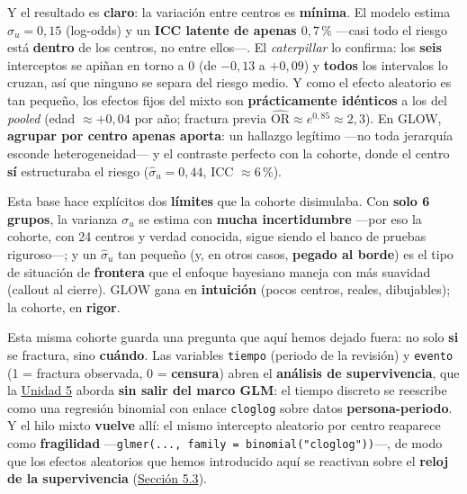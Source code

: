 \documentclass[
  letterpaper,
  DIV=11,
  numbers=noendperiod]{scrartcl}
\begin{document}
Y el resultado es \textbf{claro}: la variación entre centros es
\textbf{mínima}. El modelo estima \(\hat\sigma_u=0{,}15\) (log-odds) y
un \textbf{ICC latente de apenas \(0{,}7\,\%\)} ---casi todo el riesgo
está \textbf{dentro} de los centros, no entre ellos---. El
\emph{caterpillar} lo confirma: los \textbf{seis} interceptos se apiñan
en torno a \(0\) (de \(-0{,}13\) a \(+0{,}09\)) y \textbf{todos} los
intervalos lo cruzan, así que ninguno se separa del riesgo medio. Y como
el efecto aleatorio es tan pequeño, los efectos fijos del mixto son
\textbf{prácticamente idénticos} a los del \emph{pooled} (edad
\(\approx+0{,}04\) por año; fractura previa
\(\widehat{\text{OR}}\approx e^{0{,}85}\!\approx\!2{,}3\)). En GLOW,
\textbf{agrupar por centro apenas aporta}: un hallazgo legítimo ---no
toda jerarquía esconde heterogeneidad--- y el contraste perfecto con la
cohorte, donde el centro \textbf{sí} estructuraba el riesgo
(\(\hat\sigma_u=0{,}44\), ICC \(\approx 6\,\%\)).

Esta base hace explícitos dos \textbf{límites} que la cohorte
disimulaba. Con \textbf{solo 6 grupos}, la varianza \(\sigma_u\) se
estima con \textbf{mucha incertidumbre} ---por eso la cohorte, con 24
centros y verdad conocida, sigue siendo el banco de pruebas riguroso---;
y un \(\hat\sigma_u\) tan pequeño (y, en otros casos, \textbf{pegado al
borde}) es el tipo de situación de \textbf{frontera} que el enfoque
bayesiano maneja con más suavidad (callout al cierre). GLOW gana en
\textbf{intuición} (pocos centros, reales, dibujables); la cohorte, en
\textbf{rigor}.

\begin{tcolorbox}[enhanced jigsaw, coltitle=black, rightrule=.15mm, arc=.35mm, leftrule=.75mm, colback=white, colbacktitle=quarto-callout-note-color!10!white, left=2mm, breakable, toptitle=1mm, toprule=.15mm, bottomtitle=1mm, titlerule=0mm, title=\textcolor{quarto-callout-note-color}{\faInfo}\hspace{0.5em}{Puente a la Unidad 5}, bottomrule=.15mm, opacityback=0, opacitybacktitle=0.6, colframe=quarto-callout-note-color-frame]

Esta misma cohorte guarda una pregunta que aquí hemos dejado fuera: no
solo \textbf{si} se fractura, sino \textbf{cuándo}. Las variables
\texttt{tiempo} (periodo de la revisión) y \texttt{evento} (1 = fractura
observada, 0 = \textbf{censura}) abren el \textbf{análisis de
supervivencia}, que la \protect\hyperlink{sec-u15}{Unidad 5} aborda
\textbf{sin salir del marco GLM}: el tiempo discreto se reescribe como
una regresión binomial con enlace \texttt{cloglog} sobre datos
\textbf{persona-periodo}. Y el hilo mixto \textbf{vuelve} allí: el mismo
intercepto aleatorio por centro reaparece como \textbf{fragilidad}
---\texttt{glmer(...,\ family\ =\ binomial("cloglog"))}---, de modo que
los efectos aleatorios que hemos introducido aquí se reactivan sobre el
\textbf{reloj de la supervivencia}
(\protect\hyperlink{sec-u15-glm}{Sección 5.3}).

\end{tcolorbox}
\end{document}
